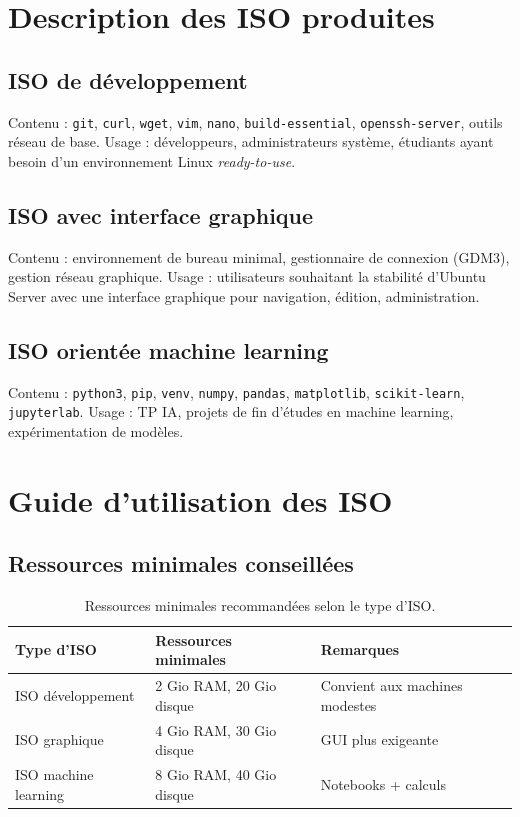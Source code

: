 \section{Description des ISO produites}

\subsection{ISO de développement}

Contenu : \texttt{git}, \texttt{curl}, \texttt{wget}, \texttt{vim}, \texttt{nano}, \texttt{build-essential}, \texttt{openssh-server}, outils réseau de base. Usage : développeurs, administrateurs système, étudiants ayant besoin d'un environnement Linux \emph{ready-to-use}.

\subsection{ISO avec interface graphique}

Contenu : environnement de bureau minimal, gestionnaire de connexion (GDM3), gestion réseau graphique. Usage : utilisateurs souhaitant la stabilité d'Ubuntu Server avec une interface graphique pour navigation, édition, administration.

\subsection{ISO orientée machine learning}

Contenu : \texttt{python3}, \texttt{pip}, \texttt{venv}, \texttt{numpy}, \texttt{pandas}, \texttt{matplotlib}, \texttt{scikit-learn}, \texttt{jupyterlab}. Usage : TP IA, projets de fin d'études en machine learning, expérimentation de modèles.

\section{Guide d'utilisation des ISO}

\subsection{Ressources minimales conseillées}

\begin{table}[H]
\centering
\small
\caption{Ressources minimales recommandées selon le type d'ISO.}
\begin{tabular}{lll}
\toprule
\textbf{Type d'ISO} & \textbf{Ressources minimales} & \textbf{Remarques} \\
\midrule
ISO développement     & 2 Gio RAM, 20 Gio disque & Convient aux machines modestes \\
ISO graphique         & 4 Gio RAM, 30 Gio disque & GUI plus exigeante \\
ISO machine learning  & 8 Gio RAM, 40 Gio disque & Notebooks + calculs \\
\bottomrule
\end{tabular}

\end{table}

